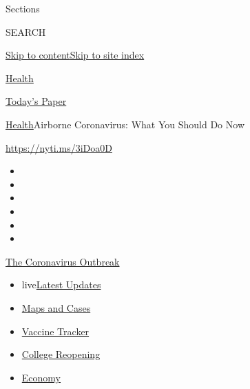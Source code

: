 Sections

SEARCH

\protect\hyperlink{site-content}{Skip to
content}\protect\hyperlink{site-index}{Skip to site index}

\href{https://www.nytimes3xbfgragh.onion/section/health}{Health}

\href{https://myaccount.nytimes3xbfgragh.onion/auth/login?response_type=cookie\&client_id=vi}{}

\href{https://www.nytimes3xbfgragh.onion/section/todayspaper}{Today's
Paper}

\href{/section/health}{Health}\textbar{}Airborne Coronavirus: What You
Should Do Now

\url{https://nyti.ms/3iDoa0D}

\begin{itemize}
\item
\item
\item
\item
\item
\item
\end{itemize}

\href{https://www.nytimes3xbfgragh.onion/news-event/coronavirus?action=click\&pgtype=Article\&state=default\&region=TOP_BANNER\&context=storylines_menu}{The
Coronavirus Outbreak}

\begin{itemize}
\tightlist
\item
  live\href{https://www.nytimes3xbfgragh.onion/2020/08/04/world/coronavirus-cases.html?action=click\&pgtype=Article\&state=default\&region=TOP_BANNER\&context=storylines_menu}{Latest
  Updates}
\item
  \href{https://www.nytimes3xbfgragh.onion/interactive/2020/us/coronavirus-us-cases.html?action=click\&pgtype=Article\&state=default\&region=TOP_BANNER\&context=storylines_menu}{Maps
  and Cases}
\item
  \href{https://www.nytimes3xbfgragh.onion/interactive/2020/science/coronavirus-vaccine-tracker.html?action=click\&pgtype=Article\&state=default\&region=TOP_BANNER\&context=storylines_menu}{Vaccine
  Tracker}
\item
  \href{https://www.nytimes3xbfgragh.onion/2020/08/02/us/covid-college-reopening.html?action=click\&pgtype=Article\&state=default\&region=TOP_BANNER\&context=storylines_menu}{College
  Reopening}
\item
  \href{https://www.nytimes3xbfgragh.onion/live/2020/08/04/business/stock-market-today-coronavirus?action=click\&pgtype=Article\&state=default\&region=TOP_BANNER\&context=storylines_menu}{Economy}
\end{itemize}

